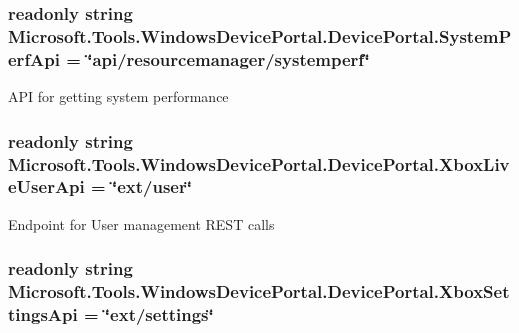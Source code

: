 \subsubsection[{\texorpdfstring{System\+Perf\+Api}{SystemPerfApi}}]{\setlength{\rightskip}{0pt plus 5cm}readonly string Microsoft.\+Tools.\+Windows\+Device\+Portal.\+Device\+Portal.\+System\+Perf\+Api = \char`\"{}api/resourcemanager/systemperf\char`\"{}\hspace{0.3cm}{\ttfamily [static]}}\hypertarget{class_microsoft_1_1_tools_1_1_windows_device_portal_1_1_device_portal_ac099bf72c4a3dd255e4c78aa74932c63}{}\label{class_microsoft_1_1_tools_1_1_windows_device_portal_1_1_device_portal_ac099bf72c4a3dd255e4c78aa74932c63}


A\+PI for getting system performance 

\subsubsection[{\texorpdfstring{Xbox\+Live\+User\+Api}{XboxLiveUserApi}}]{\setlength{\rightskip}{0pt plus 5cm}readonly string Microsoft.\+Tools.\+Windows\+Device\+Portal.\+Device\+Portal.\+Xbox\+Live\+User\+Api = \char`\"{}ext/user\char`\"{}\hspace{0.3cm}{\ttfamily [static]}}\hypertarget{class_microsoft_1_1_tools_1_1_windows_device_portal_1_1_device_portal_ac07403942d72a53432f1a42c9410c929}{}\label{class_microsoft_1_1_tools_1_1_windows_device_portal_1_1_device_portal_ac07403942d72a53432f1a42c9410c929}


Endpoint for User management R\+E\+ST calls 

\subsubsection[{\texorpdfstring{Xbox\+Settings\+Api}{XboxSettingsApi}}]{\setlength{\rightskip}{0pt plus 5cm}readonly string Microsoft.\+Tools.\+Windows\+Device\+Portal.\+Device\+Portal.\+Xbox\+Settings\+Api = \char`\"{}ext/settings\char`\"{}\hspace{0.3cm}{\ttfamily [static]}}\hypertarget{class_microsoft_1_1_tools_1_1_windows_device_portal_1_1_device_portal_a54fa5b85f6df793ed597e78538b357e5}{}\label{class_microsoft_1_1_tools_1_1_windows_device_portal_1_1_device_portal_a54fa5b85f6df793ed597e78538b357e5}



